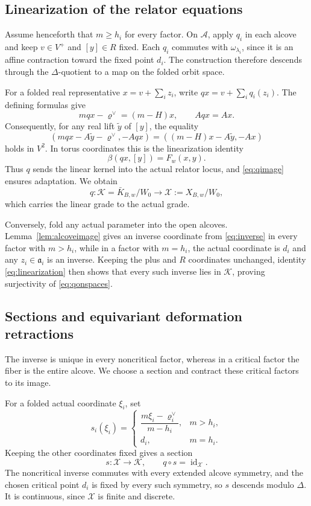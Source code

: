 \documentclass[11pt,a4paper,reqno]{amsart}
\theoremstyle{plain}
\theoremstyle{definition}
\theoremstyle{remark}
\numberwithin{equation}{section}
\newcommand{\fa}{\mathfrak a}
\DeclareMathOperator{\id}{id}
\newcommand{\rh}{\varrho^\vee}
\begin{document}
\subsection{Linearization of the relator equations}

Assume henceforth that $m\ge h_i$ for every factor. On $\mathcal A$, apply $q_i$ in each alcove and keep $v\in V^+$ and $[y]\in R$ fixed. Each $q_i$ commutes with $\omega_{\lambda_i}$, since it is an affine contraction toward the fixed point $d_i$. The construction therefore descends through the $\Delta$-quotient to a map on the folded orbit space.

For a folded real representative $x=v+\sum_i z_i$, write $qx=v+\sum_i q_i(z_i)$. The defining formulas give
\[
mqx-\rh=(m-H)x,\qquad Aqx=Ax.
\]
Consequently, for any real lift $\widetilde y$ of $[y]$, the equality
\[
(mqx-A\widetilde y-\rh,-Aqx) =((m-H)x-A\widetilde y,-Ax)
\]
holds in $V^2$. In torus coordinates this is the linearization identity
\begin{equation}\label{eq:linearization}
\beta(qx,[y])=F_w(x,y).
\end{equation}
Thus $q$ sends the linear kernel into the actual relator locus, and \eqref{eq:qimage} ensures adaptation. We obtain
\begin{equation}\label{eq:qonspaces}
q\colon\mathcal K=\bar K_{B,w}/W_0\longrightarrow \mathcal X:=X_{B,w}/W_0,
\end{equation}
which carries the linear grade to the actual grade.

Conversely, fold any actual parameter into the open alcoves. Lemma~\ref{lem:alcoveimage} gives an inverse coordinate from \eqref{eq:inverse} in every factor with $m>h_i$, while in a factor with $m=h_i$, the actual coordinate is $d_i$ and any $z_i\in\fa_i$ is an inverse. Keeping the plus and $R$ coordinates unchanged, identity \eqref{eq:linearization} then shows that every such inverse lies in $\mathcal K$, proving surjectivity of \eqref{eq:qonspaces}.

\subsection{Sections and equivariant deformation retractions}

The inverse is unique in every noncritical factor, whereas in a critical factor the fiber is the entire alcove. We choose a section and contract these critical factors to its image.

For a folded actual coordinate $\xi_i$, set
\[
s_i(\xi_i)=
\begin{cases}
\dfrac{m\xi_i-\rh_i}{m-h_i},&m>h_i,\\
d_i,&m=h_i.
\end{cases}
\]
Keeping the other coordinates fixed gives a section
\[
s\colon\mathcal X\longrightarrow\mathcal K,\qquad q\circ s=\id_{\mathcal X}.
\]
The noncritical inverse commutes with every extended alcove symmetry, and the chosen critical point $d_i$ is fixed by every such symmetry, so $s$ descends modulo $\Delta$. It is continuous, since $\mathcal X$ is finite and discrete.
\end{document}

